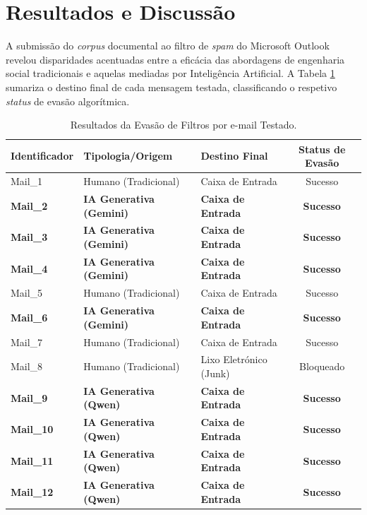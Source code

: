 \documentclass[pdflatex,sn-mathphys-num]{sn-jnl}
\theoremstyle{thmstyleone}%
\theoremstyle{thmstyletwo}%
\theoremstyle{thmstylethree}%
\begin{document}
\section{Resultados e Discussão}\label{sec4}
A submissão do \textit{corpus} documental ao filtro de \textit{spam} do Microsoft Outlook revelou disparidades acentuadas entre a eficácia das abordagens de engenharia social tradicionais e aquelas mediadas por Inteligência Artificial. A Tabela \ref{tab:resultados_teste} sumariza o destino final de cada mensagem testada, classificando o respetivo \textit{status} de evasão algorítmica.

\begin{table}[htbp]
    \centering
    \caption{Resultados da Evasão de Filtros por e-mail Testado.}
    \label{tab:resultados_teste}
    \begin{tabular}{lllc}
        \toprule
        \textbf{Identificador} & \textbf{Tipologia/Origem} & \textbf{Destino Final} & \textbf{Status de Evasão} \\
        \midrule
        Mail\_1 & Humano (Tradicional) & Caixa de Entrada & Sucesso \\
        \textbf{Mail\_2} & \textbf{IA Generativa (Gemini)} & \textbf{Caixa de Entrada} & \textbf{Sucesso} \\
        \textbf{Mail\_3} & \textbf{IA Generativa (Gemini)} & \textbf{Caixa de Entrada} & \textbf{Sucesso} \\
        \textbf{Mail\_4} & \textbf{IA Generativa (Gemini)} & \textbf{Caixa de Entrada} & \textbf{Sucesso} \\
        Mail\_5 & Humano (Tradicional) & Caixa de Entrada & Sucesso \\
        \textbf{Mail\_6} & \textbf{IA Generativa (Gemini)} & \textbf{Caixa de Entrada} & \textbf{Sucesso} \\
        Mail\_7 & Humano (Tradicional) & Caixa de Entrada & Sucesso \\
        Mail\_8 & Humano (Tradicional) & Lixo Eletrónico (Junk) & Bloqueado \\
        \textbf{Mail\_9} & \textbf{IA Generativa (Qwen)} & \textbf{Caixa de Entrada} & \textbf{Sucesso} \\
        \textbf{Mail\_10} & \textbf{IA Generativa (Qwen)} & \textbf{Caixa de Entrada} & \textbf{Sucesso} \\
        \textbf{Mail\_11} & \textbf{IA Generativa (Qwen)} & \textbf{Caixa de Entrada} & \textbf{Sucesso} \\
        \textbf{Mail\_12} & \textbf{IA Generativa (Qwen)} & \textbf{Caixa de Entrada} & \textbf{Sucesso} \\

\end{tabular}
\end{table}
\end{document}
